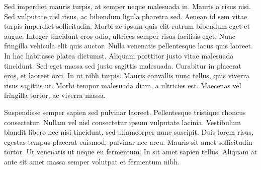 Sed imperdiet mauris turpis, at semper neque malesuada in. Mauris a risus nisi. Sed vulputate nisl risus, ac bibendum ligula pharetra sed. Aenean id sem vitae turpis imperdiet sollicitudin. Morbi ac ipsum quis elit rutrum bibendum eget et augue. Integer tincidunt eros odio, ultrices semper risus facilisis eget. Nunc fringilla vehicula elit quis auctor. Nulla venenatis pellentesque lacus quis laoreet. In hac habitasse platea dictumst. Aliquam porttitor justo vitae malesuada tincidunt. Sed eget massa sed justo sagittis malesuada. Curabitur in placerat eros, et laoreet orci. In ut nibh turpis. Mauris convallis nunc tellus, quis viverra risus sagittis ut. Morbi tempor malesuada diam, a ultricies est. Maecenas vel fringilla tortor, ac viverra massa.

Suspendisse semper sapien sed pulvinar laoreet. Pellentesque tristique rhoncus consectetur. Nullam vel nisl consectetur ipsum vulputate lacinia. Vestibulum blandit libero nec nisi tincidunt, sed ullamcorper nunc suscipit. Duis lorem risus, egestas tempus placerat euismod, pulvinar nec arcu. Mauris sit amet sollicitudin tortor. Ut venenatis ut neque eu fermentum. In sit amet sapien tellus. Aliquam at ante sit amet massa semper volutpat et fermentum nibh.
